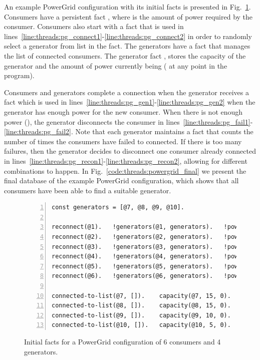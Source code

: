 An example PowerGrid configuration with its initial facts is presented in
Fig.~\ref{code:threads:powergrid_init}. Consumers have a persistent fact
, where  is the amount of power required by the
consumer. Consumers also start with a
 fact that is used in
lines~\ref{line:threads:pg_connect1}-\ref{line:threads:pg_connect2} in order to
randomly select a generator from list  in the 
fact. The generators have a  fact that manages the
list of connected consumers. The generator fact ,
stores the  capacity of the generator and the amount of power
currently being  ( at any point in the program).

Consumers and generators complete a connection when the generator receives a
 fact which is used in
lines~\ref{line:threads:pg_gen1}-\ref{line:threads:pg_gen2} when the generator
has enough power for the new consumer. When there is not enough power
(), the generator disconnects the consumer in
lines~\ref{line:threads:pg_fail1}-\ref{line:threads:pg_fail2}. Note that each
generator maintains a  fact that counts the number of times the
consumers have failed to connected. If there is too many failures, then the
generator decides to disconnect one consumer already connected in
lines~\ref{line:threads:pg_recon1}-\ref{line:threads:pg_recon2}, allowing for
different combinations to happen. In Fig.~\ref{code:threads:powergrid_final} we
present the final database of the example PowerGrid configuration, which shows
that all consumers have been able to find a suitable generator.

\begin{figure}[h!]
\begin{Verbatim}[numbers=left,fontsize=\codesize,commandchars=*\#\&]
const generators = [@7, @8, @9, @10].

reconnect(@1).   !generators(@1, generators).   !power(@1, 5).
reconnect(@2).   !generators(@2, generators).   !power(@2, 10).
reconnect(@3).   !generators(@3, generators).   !power(@3, 5).
reconnect(@4).   !generators(@4, generators).   !power(@4, 10).
reconnect(@5).   !generators(@5, generators).   !power(@5, 10).
reconnect(@6).   !generators(@6, generators).   !power(@6, 5).

connected-to-list(@7, []).    capacity(@7, 15, 0).   fail(@7, 0).
connected-to-list(@8, []).    capacity(@8, 15, 0).   fail(@8, 0).
connected-to-list(@9, []).    capacity(@9, 10, 0).   fail(@9, 0).
connected-to-list(@10, []).   capacity(@10, 5, 0).   fail(@10, 0).
\end{Verbatim}
\caption{Initial facts for a PowerGrid configuration of 6 consumers and 4 generators.}
\label{code:threads:powergrid_init}
\end{figure}

